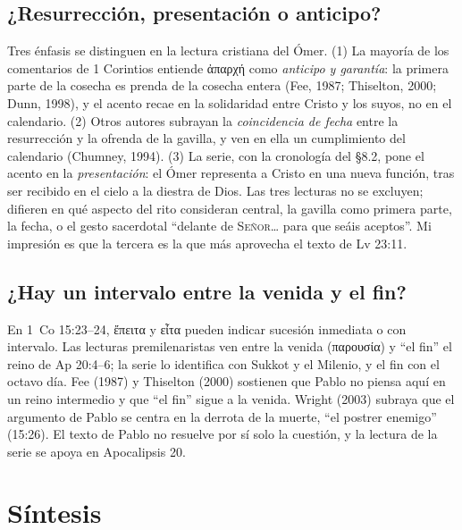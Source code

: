 \documentclass[11pt,letterpaper]{article}
\newcommand{\grc}[1]{\foreignlanguage{ancientgreek}{#1}}
\newcommand{\SENOR}{\textsc{Señor}}
\begin{document}
\subsection{¿Resurrección, presentación o anticipo?}
Tres énfasis se distinguen en la lectura cristiana del Ómer. (1) La mayoría de los comentarios de 1 Corintios entiende \grc{ἀπαρχή} como \emph{anticipo y garantía}: la primera parte de la cosecha es prenda de la cosecha entera (Fee, 1987; Thiselton, 2000; Dunn, 1998), y el acento recae en la solidaridad entre Cristo y los suyos, no en el calendario. (2) Otros autores subrayan la \emph{coincidencia de fecha} entre la resurrección y la ofrenda de la gavilla, y ven en ella un cumplimiento del calendario (Chumney, 1994). (3) La serie, con la cronología del §8.2, pone el acento en la \emph{presentación}: el Ómer representa a Cristo en una nueva función, tras ser recibido en el cielo a la diestra de Dios. Las tres lecturas no se excluyen; difieren en qué aspecto del rito consideran central, la gavilla como primera parte, la fecha, o el gesto sacerdotal ``delante de \SENOR{}\ldots{} para que seáis aceptos''. Mi impresión es que la tercera es la que más aprovecha el texto de Lv 23:11.

\subsection{¿Hay un intervalo entre la venida y el fin?}
En 1~Co 15:23--24, \grc{ἔπειτα} y \grc{εἶτα} pueden indicar sucesión inmediata o con intervalo. Las lecturas premilenaristas ven entre la venida (\grc{παρουσία}) y ``el fin'' el reino de Ap 20:4--6; la serie lo identifica con Sukkot y el Milenio, y el fin con el octavo día. Fee (1987) y Thiselton (2000) sostienen que Pablo no piensa aquí en un reino intermedio y que ``el fin'' sigue a la venida. Wright (2003) subraya que el argumento de Pablo se centra en la derrota de la muerte, ``el postrer enemigo'' (15:26). El texto de Pablo no resuelve por sí solo la cuestión, y la lectura de la serie se apoya en Apocalipsis 20.

\section{Síntesis}
\end{document}
